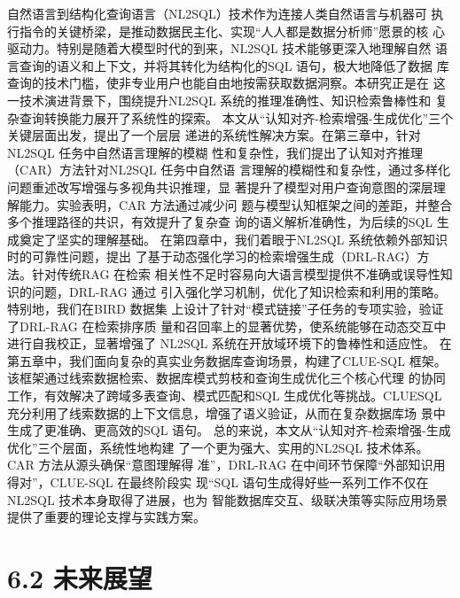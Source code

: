 \documentclass[12pt,a4paper,openright,UTF8]{ctexbook}
\begin{document}
自然语言到结构化查询语言（NL2SQL）技术作为连接人类自然语言与机器可 执行指令的关键桥梁，是推动数据民主化、实现“人人都是数据分析师”愿景的核 心驱动力。特别是随着大模型时代的到来，NL2SQL 技术能够更深入地理解自然 语言查询的语义和上下文，并将其转化为结构化的SQL 语句，极大地降低了数据 库查询的技术门槛，使非专业用户也能自由地按需获取数据洞察。本研究正是在 这一技术演进背景下，围绕提升NL2SQL 系统的推理准确性、知识检索鲁棒性和 复杂查询转换能力展开了系统性的探索。 本文从“认知对齐-检索增强-生成优化”三个关键层面出发，提出了一个层层 递进的系统性解决方案。在第三章中，针对NL2SQL 任务中自然语言理解的模糊 性和复杂性，我们提出了认知对齐推理（CAR）方法针对NL2SQL 任务中自然语 言理解的模糊性和复杂性，通过多样化问题重述改写增强与多视角共识推理，显 著提升了模型对用户查询意图的深层理解能力。实验表明，CAR 方法通过减少问 题与模型认知框架之间的差距，并整合多个推理路径的共识，有效提升了复杂查 询的语义解析准确性，为后续的SQL 生成奠定了坚实的理解基础。 在第四章中，我们着眼于NL2SQL 系统依赖外部知识时的可靠性问题，提出 了基于动态强化学习的检索增强生成（DRL-RAG）方法。针对传统RAG 在检索 相关性不足时容易向大语言模型提供不准确或误导性知识的问题，DRL-RAG 通过 引入强化学习机制，优化了知识检索和利用的策略。特别地，我们在BIRD 数据集 上设计了针对“模式链接”子任务的专项实验，验证了DRL-RAG 在检索排序质 量和召回率上的显著优势，使系统能够在动态交互中进行自我校正，显著增强了 NL2SQL 系统在开放域环境下的鲁棒性和适应性。 在第五章中，我们面向复杂的真实业务数据库查询场景，构建了CLUE-SQL 框架。该框架通过线索数据检索、数据库模式剪枝和查询生成优化三个核心代理 的协同工作，有效解决了跨域多表查询、模式匹配和SQL 生成优化等挑战。CLUESQL 充分利用了线索数据的上下文信息，增强了语义验证，从而在复杂数据库场 景中生成了更准确、更高效的SQL 语句。 总的来说，本文从“认知对齐-检索增强-生成优化”三个层面，系统性地构建 了一个更为强大、实用的NL2SQL 技术体系。CAR 方法从源头确保“意图理解得 准”，DRL-RAG 在中间环节保障“外部知识用得对”，CLUE-SQL 在最终阶段实 现“SQL 语句生成得好些一系列工作不仅在NL2SQL 技术本身取得了进展，也为 智能数据库交互、级联决策等实际应用场景提供了重要的理论支撑与实践方案。

\section{6.2 未来展望}
\end{document}
